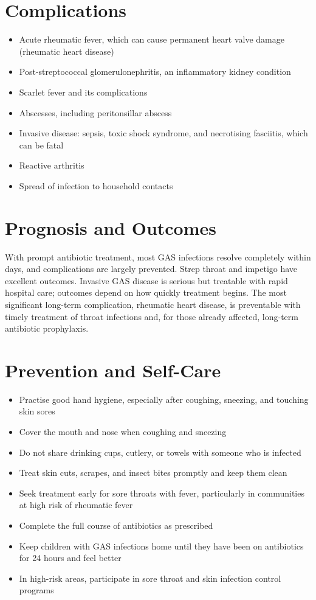 \section*{Complications}
\begin{itemize}
    \item Acute rheumatic fever, which can cause permanent heart valve damage (rheumatic heart disease)
    \item Post-streptococcal glomerulonephritis, an inflammatory kidney condition
    \item Scarlet fever and its complications
    \item Abscesses, including peritonsillar abscess
    \item Invasive disease: sepsis, toxic shock syndrome, and necrotising fasciitis, which can be fatal
    \item Reactive arthritis
    \item Spread of infection to household contacts
\end{itemize}

\section*{Prognosis and Outcomes}
With prompt antibiotic treatment, most GAS infections resolve completely within days, and complications are largely prevented. Strep throat and impetigo have excellent outcomes. Invasive GAS disease is serious but treatable with rapid hospital care; outcomes depend on how quickly treatment begins. The most significant long-term complication, rheumatic heart disease, is preventable with timely treatment of throat infections and, for those already affected, long-term antibiotic prophylaxis.

\section*{Prevention and Self-Care}
\begin{itemize}
    \item Practise good hand hygiene, especially after coughing, sneezing, and touching skin sores
    \item Cover the mouth and nose when coughing and sneezing
    \item Do not share drinking cups, cutlery, or towels with someone who is infected
    \item Treat skin cuts, scrapes, and insect bites promptly and keep them clean
    \item Seek treatment early for sore throats with fever, particularly in communities at high risk of rheumatic fever
    \item Complete the full course of antibiotics as prescribed
    \item Keep children with GAS infections home until they have been on antibiotics for 24 hours and feel better
    \item In high-risk areas, participate in sore throat and skin infection control programs
\end{itemize}


